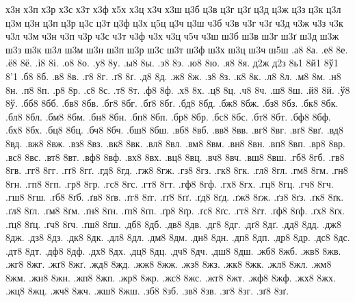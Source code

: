 {х3н
х3п
х3р
х3с
х3т
х3ф
х5х
х3ц
х3ч
х3ш
ц3б
ц3в
ц3г
ц3ґ
ц3д
ц3ж
ц3з
ц3к
ц3л
ц3м
ц3н
ц3п
ц3р
ц3с
ц3т
ц3ф
ц3х
ц5ц
ц3ч
ц3ш
ч3б
ч3в
ч3г
ч3ґ
ч3д
ч3ж
ч3з
ч3к
ч3л
ч3м
ч3н
ч3п
ч3р
ч3с
ч3т
ч3ф
ч3х
ч3ц
ч5ч
ч3ш
ш3б
ш3в
ш3г
ш3ґ
ш3д
ш3ж
ш3з
ш3к
ш3л
ш3м
ш3н
ш3п
ш3р
ш3с
ш3т
ш3ф
ш3х
ш3ц
ш3ч
ш5ш
.а8
8а.
.е8
8е.
.ё8
8ё.
.і8
8і.
.о8
8о.
.у8
8у.
.ы8
8ы.
.э8
8э.
.ю8
8ю.
.я8
8я.
д2ж
д2з
8ь1
8й1
8ў1
8'1
.б8
8б.
.в8
8в.
.г8
8г.
.ґ8
8ґ.
.д8
8д.
.ж8
8ж.
.з8
8з.
.к8
8к.
.л8
8л.
.м8
8м.
.н8
8н.
.п8
8п.
.р8
8р.
.с8
8с.
.т8
8т.
.ф8
8ф.
.х8
8х.
.ц8
8ц.
.ч8
8ч.
.ш8
8ш.
.й8
8й.
.ў8
8ў.
.бб8
8бб.
.бв8
8бв.
.бг8
8бг.
.бґ8
8бґ.
.бд8
8бд.
.бж8
8бж.
.бз8
8бз.
.бк8
8бк.
.бл8
8бл.
.бм8
8бм.
.бн8
8бн.
.бп8
8бп.
.бр8
8бр.
.бс8
8бс.
.бт8
8бт.
.бф8
8бф.
.бх8
8бх.
.бц8
8бц.
.бч8
8бч.
.бш8
8бш.
.вб8
8вб.
.вв8
8вв.
.вг8
8вг.
.вґ8
8вґ.
.вд8
8вд.
.вж8
8вж.
.вз8
8вз.
.вк8
8вк.
.вл8
8вл.
.вм8
8вм.
.вн8
8вн.
.вп8
8вп.
.вр8
8вр.
.вс8
8вс.
.вт8
8вт.
.вф8
8вф.
.вх8
8вх.
.вц8
8вц.
.вч8
8вч.
.вш8
8вш.
.гб8
8гб.
.гв8
8гв.
.гг8
8гг.
.гґ8
8гґ.
.гд8
8гд.
.гж8
8гж.
.гз8
8гз.
.гк8
8гк.
.гл8
8гл.
.гм8
8гм.
.гн8
8гн.
.гп8
8гп.
.гр8
8гр.
.гс8
8гс.
.гт8
8гт.
.гф8
8гф.
.гх8
8гх.
.гц8
8гц.
.гч8
8гч.
.гш8
8гш.
.ґб8
8ґб.
.ґв8
8ґв.
.ґг8
8ґг.
.ґґ8
8ґґ.
.ґд8
8ґд.
.ґж8
8ґж.
.ґз8
8ґз.
.ґк8
8ґк.
.ґл8
8ґл.
.ґм8
8ґм.
.ґн8
8ґн.
.ґп8
8ґп.
.ґр8
8ґр.
.ґс8
8ґс.
.ґт8
8ґт.
.ґф8
8ґф.
.ґх8
8ґх.
.ґц8
8ґц.
.ґч8
8ґч.
.ґш8
8ґш.
.дб8
8дб.
.дв8
8дв.
.дг8
8дг.
.дґ8
8дґ.
.дд8
8дд.
.дж8
8дж.
.дз8
8дз.
.дк8
8дк.
.дл8
8дл.
.дм8
8дм.
.дн8
8дн.
.дп8
8дп.
.др8
8др.
.дс8
8дс.
.дт8
8дт.
.дф8
8дф.
.дх8
8дх.
.дц8
8дц.
.дч8
8дч.
.дш8
8дш.
.жб8
8жб.
.жв8
8жв.
.жг8
8жг.
.жґ8
8жґ.
.жд8
8жд.
.жж8
8жж.
.жз8
8жз.
.жк8
8жк.
.жл8
8жл.
.жм8
8жм.
.жн8
8жн.
.жп8
8жп.
.жр8
8жр.
.жс8
8жс.
.жт8
8жт.
.жф8
8жф.
.жх8
8жх.
.жц8
8жц.
.жч8
8жч.
.жш8
8жш.
.зб8
8зб.
.зв8
8зв.
.зг8
8зг.
.зґ8
8зґ.
}
